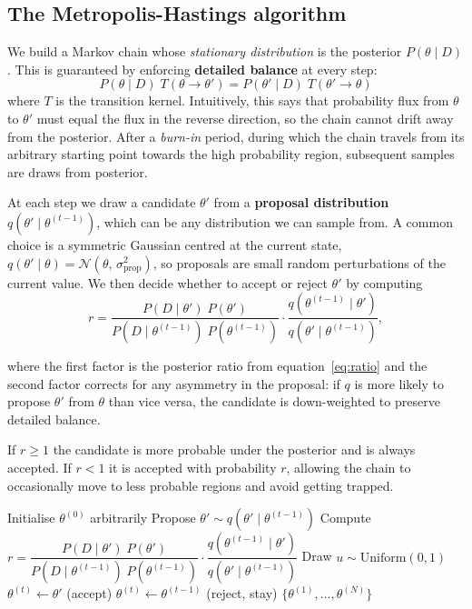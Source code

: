 \documentclass[12pt, a4paper]{article}
\begin{document}
\subsection{The Metropolis-Hastings algorithm}

We build a Markov chain whose \textit{stationary distribution} is
the posterior $P(\theta \mid D)$. This is guaranteed by enforcing
\textbf{detailed balance} at every step:
\[
    P(\theta \mid D) \; T(\theta \to \theta')
    = P(\theta' \mid D) \; T(\theta' \to \theta)
\]
where $T$ is the transition kernel. Intuitively, this says that
probability flux from $\theta$ to $\theta'$ must equal the flux
in the reverse direction, so the chain cannot drift away from the
posterior. After a \textit{burn-in} period, during which the
chain travels from its arbitrary starting point towards the high
probability region, subsequent samples are draws from
posterior.

At each step we draw a candidate $\theta'$ from a
\textbf{proposal distribution} $q(\theta' \mid \theta^{(t-1)})$,
which can be any distribution we can sample from. A common choice
is a symmetric Gaussian centred at the current state,
$q(\theta' \mid \theta) = \mathcal{N}(\theta,\, \sigma_\text{prop}^2)$,
so proposals are small random perturbations of the current value.
We then decide whether to accept or reject $\theta'$ by computing
\vspace{-2mm}
\[
    r = \frac{P(D \mid \theta') \; P(\theta')}{P(D \mid \theta^{(t-1)}) \; P(\theta^{(t-1)})}
        \cdot
        \frac{q(\theta^{(t-1)} \mid \theta')}{q(\theta' \mid \theta^{(t-1)})},
\]

where the first factor is the posterior ratio from
equation~\eqref{eq:ratio} and the second factor corrects for any
asymmetry in the proposal: if $q$ is more likely to propose
$\theta'$ from $\theta$ than vice versa, the candidate is
down-weighted to preserve detailed balance.

If $r \geq 1$ the candidate is more probable under the posterior
and is always accepted. If $r < 1$ it is accepted with probability
$r$, allowing the chain to occasionally move to less probable
regions and avoid getting trapped.

\begin{algorithm}[H]
\caption{Metropolis-Hastings}
\begin{algorithmic}[1]
\State Initialise $\theta^{(0)}$ arbitrarily
    \State Propose $\theta' \sim q(\theta' \mid \theta^{(t-1)})$
    \State Compute $r = \dfrac{P(D \mid \theta')\;P(\theta')}
                               {P(D \mid \theta^{(t-1)})\;P(\theta^{(t-1)})}
                        \cdot
                        \dfrac{q(\theta^{(t-1)} \mid \theta')}
                               {q(\theta' \mid \theta^{(t-1)})}$
    \State Draw $u \sim \mathrm{Uniform}(0, 1)$
        \State $\theta^{(t)} \leftarrow \theta'$ \quad (accept)
    \Else
        \State $\theta^{(t)} \leftarrow \theta^{(t-1)}$ \quad (reject, stay)
    \EndIf
\EndFor
\State \Return $\{\theta^{(1)}, \ldots, \theta^{(N)}\}$
\end{algorithmic}
\end{algorithm}
\end{document}
